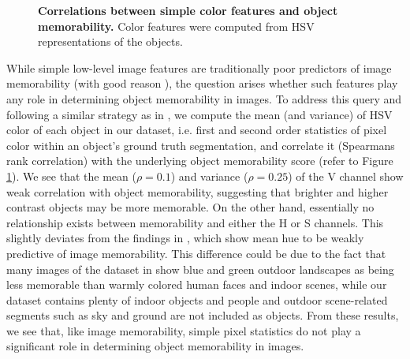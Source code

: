 \begin{figure}[!htb]
\centering
{}
\vspace{-5mm}\caption{\footnotesize\textbf{Correlations between simple color features and object memorability.} Color features were computed from HSV representations of the objects. }\label{fig:simple}
\end{figure}

While simple low-level image features are traditionally poor predictors of image memorability \cite{isola11} (with good reason \cite{konkle10}), the question arises whether such features play any role in determining object memorability in images. To address this query and following a similar strategy as in \cite{isola11,isola14}, we compute the mean (and variance) of HSV color of each object in our dataset, i.e. first and second order  statistics of pixel color within an object's ground truth segmentation, and correlate it (Spearmans rank correlation) with the underlying object memorability score (refer to Figure \ref{fig:simple}). We see that the mean ($\rho = 0.1$) and variance ($\rho=0.25$) of the V channel show weak correlation with object memorability, suggesting that brighter and higher contrast objects may be more memorable. On the other hand, essentially no relationship exists between memorability and either the H or S channels. This slightly deviates from the findings in \cite{isola11}, which show mean hue to be weakly predictive of image memorability. This difference could be due to the fact that many images of the dataset in \cite{isola11} show blue and green outdoor landscapes as being less memorable than warmly colored human faces and indoor scenes, while our dataset contains plenty of indoor objects and people and outdoor scene-related segments such as sky and ground are not included as objects. From these results, we see that, like image memorability, simple pixel statistics do not play a significant role in determining object memorability in images.

